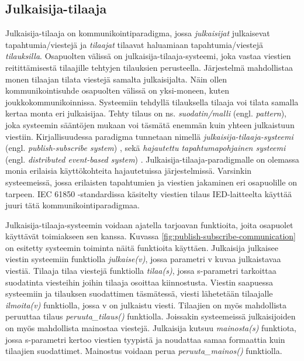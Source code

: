 \subsection{Julkaisija-tilaaja}
Julkaisija-tilaaja on kommunikointiparadigma, jossa \emph{julkaisijat} julkaisevat tapahtumia/viestejä ja \emph{tilaajat} tilaavat haluamiaan tapahtumia/viestejä \emph{tilauksilla}. Osapuolten välissä on julkaisija-tilaaja-systeemi, joka vastaa viestien reitittämisestä tilaajille tehtyjen tilauksien perusteella. Järjestelmä mahdollistaa monen tilaajan tilata viestejä samalta julkaisijalta. Näin ollen kommunikointisuhde osapuolten välissä on yksi-moneen, kuten joukkokommunikoinnissa. Systeemiin tehdyllä tilauksella tilaaja voi tilata samalla kertaa monta eri julkaisijaa. Tehty tilaus on ns. \emph{suodatin/malli} (engl. \emph{pattern}), joka systeemin sääntöjen mukaan voi täsmätä enemmän kuin yhteen julkaistuun viestiin. Kirjallisuudessa paradigma tunnetaan nimellä \emph{julkaisija-tilaaja-systeemi} (engl. \emph{publish-subscribe system}) \cite{baldoni2005distributed}, sekä \emph{hajautettu tapahtumapohjainen systeemi} (engl. \emph{distributed event-based system}) \cite{distributed-event-based-systems}. Julkaisija-tilaaja-paradigmalle on olemassa monia erilaisia käyttökohteita hajautetuissa järjestelmissä. Varsinkin systeemeissä, jossa erilaisten tapahtumien ja viestien jakaminen eri osapuolille on tarpeen. IEC 61850 -standardissa käsitelty viestien tilaus IED-laitteelta käyttää juuri tätä kommunikointiparadigmaa.

Julkaisija-tilaaja-systeemin voidaan ajatella tarjoavan funktioita, joita osapuolet käyttävät toimiakseen sen kanssa. Kuvassa \ref{fig:publish-subscribe-communication} on esitetty systeemin toiminta näitä funktioita käyttäen. Julkaisija julkaisee viestin systeemiin funktiolla \emph{julkaise(v)}, jossa parametri v kuvaa julkaistavaa viestiä. Tilaaja tilaa viestejä funktiolla \emph{tilaa(s)}, jossa s-parametri tarkoittaa suodatinta viesteihin joihin tilaaja osoittaa kiinnostusta. Viestin saapuessa systeemiin ja tilauksen suodattimen täsmätessä, viesti lähetetään tilaajalle \emph{ilmoita(v)} funktiolla, jossa v on julkaistu viesti. Tilaajien on myös mahdollista peruuttaa tilaus \emph{peruuta\_tilaus()} funktiolla. Joissakin systeemeissä julkaisijoiden on myös mahdollista mainostaa viestejä. Julkaisija kutsuu \emph{mainosta(s)} funktiota, jossa s-parametri kertoo viestien tyypistä ja noudattaa samaa formaattia kuin tilaajien suodattimet. Mainostus voidaan perua \emph{peruuta\_mainos()} funktiolla. \mbox{\cite[s.~2--3]{baldoni2005distributed}} \mbox{\cite[s.~26--28]{distributed-event-based-systems}}

